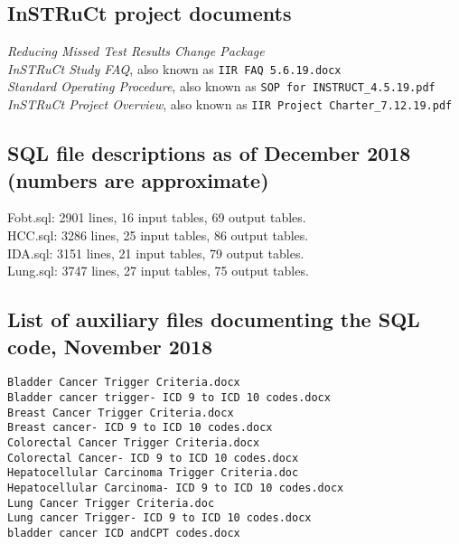 \documentclass{article}
\begin{document}
\subsection{InSTRuCt project documents}

\emph{Reducing Missed Test Results Change Package}\\
\emph{InSTRuCt Study FAQ}, also known as \texttt{IIR FAQ 5.6.19.docx}\\
\emph{Standard Operating Procedure}, also known as \texttt{SOP for
  INSTRUCT\_4.5.19.pdf}\\
\emph{InSTRuCt Project Overview}, also known as \texttt{IIR Project
  Charter\_7.12.19.pdf}

\subsection{SQL file descriptions as of December 2018 (numbers are approximate)}

Fobt.sql: 2901 lines, 16 input tables, 69 output tables.  \\
HCC.sql: 3286 lines, 25 input tables, 86 output tables.  \\
IDA.sql: 3151 lines, 21 input tables, 79 output tables.  \\
Lung.sql: 3747 lines, 27 input tables, 75 output tables.  \\

\subsection{List of auxiliary files documenting the SQL code, November 2018}

\begin{verbatim}
Bladder Cancer Trigger Criteria.docx
Bladder cancer trigger- ICD 9 to ICD 10 codes.docx
Breast Cancer Trigger Criteria.docx
Breast cancer- ICD 9 to ICD 10 codes.docx
Colorectal Cancer Trigger Criteria.docx
Colorectal Cancer- ICD 9 to ICD 10 codes.docx
Hepatocellular Carcinoma Trigger Criteria.doc
Hepatocellular Carcinoma- ICD 9 to ICD 10 codes.docx
Lung Cancer Trigger Criteria.doc
Lung cancer Trigger- ICD 9 to ICD 10 codes.docx
bladder cancer ICD andCPT codes.docx
\end{verbatim}
\end{document}
